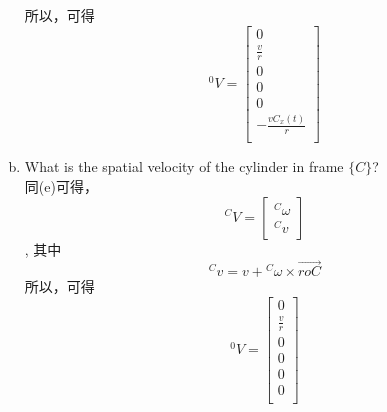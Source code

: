 \begin{enumerate}[(a)]
    所以，可得\[{}^0V = \begin{bmatrix}
        0 \\ \frac{v}{r} \\ 0 \\ 0 \\ 0 \\ -\frac{vC_x(t)}{r} \\
    \end{bmatrix}\]
    \item What is the spatial velocity of the cylinder in frame $\{C\}$?\\
    同(e)可得，\[{}^CV = \begin{bmatrix}
        {}^C\omega \\ {}^Cv
    \end{bmatrix}\], 其中
    \[{}^Cv = v + {}^C\omega \times \overrightarrow{roC}\]
    所以，可得\[{}^0V = \begin{bmatrix}
        0 \\ \frac{v}{r} \\ 0 \\ 0 \\ 0 \\ 0 \\
    \end{bmatrix}\]
\end{enumerate}